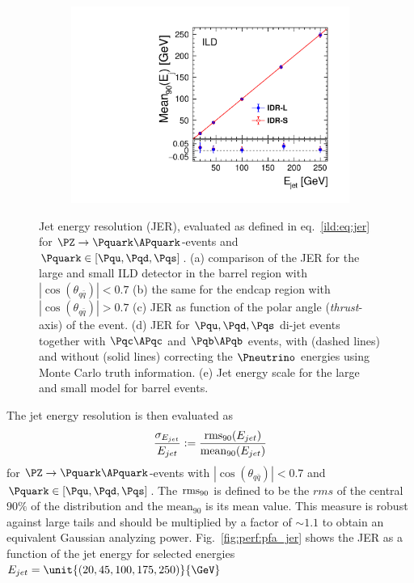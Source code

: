 \begin{figure}[htbp]
\begin{subfigure}{0.49\hsize}
 \includegraphics[width=\hsize]{Performance/fig/JESs_uds_l5_vs_s5.pdf}
 \caption{  \label{fig:perf:pfa_jes}}
 \end{subfigure}
\caption{
  Jet energy resolution (JER), evaluated as defined in eq.~\ref{ild:eq:jer} for $\PZ\rightarrow \Pquark\APquark$-events and $\Pquark \in [\Pqu,\Pqd,\Pqs]$.
  (a) comparison of the JER for the large and small ILD detector in the barrel region with
  $|\cos(\theta_{q\bar q})|<0.7$  (b) the same for the endcap region with  $|\cos(\theta_{q\bar q})|>0.7$
  (c) JER as function of the polar angle ({\em thrust}-axis) of the event. (d) JER for $\Pqu,\Pqd,\Pqs$ di-jet events together with $\Pqc\APqc$ and $\Pqb\APqb$ events,
  with (dashed lines) and without (solid lines) correcting the $\Pneutrino$ energies using Monte Carlo truth information. (e) Jet energy scale for the large and small model
  for barrel events.
  }
\label{fig:perf:pfa}
\end{figure}
%
%
The jet energy resolution is then evaluated as 
\begin{equation}\label{ild:eq:jer}
\frac{ \sigma_{E_{jet}} } { E_{jet}}  :=  \frac{\mathrm{rms}_{90}(E_{jet})}{ \mathrm{mean}_{90}(E_{jet})}
\end{equation}
for $\PZ\rightarrow \Pquark\APquark$-events with $|\cos(\theta_{q\bar q})|<0.7$ and $\Pquark \in [\Pqu,\Pqd,\Pqs]$.
The $\mathrm{rms}_{90}$ is defined to be the $rms$ of the central $90\%$ of the distribution and the $\mathrm{mean}_{90}$ is its mean value.
This measure is robust against large tails and
should be multiplied by a factor of $\sim1.1$ to obtain an equivalent Gaussian analyzing power\cite{ild:bib:PandoraPFA}.
Fig.~\ref{fig:perf:pfa_jer} shows the JER as a function of the jet energy for selected energies $E_{jet}=\unit{(20, 45, 100, 175, 250)}{\GeV}$
